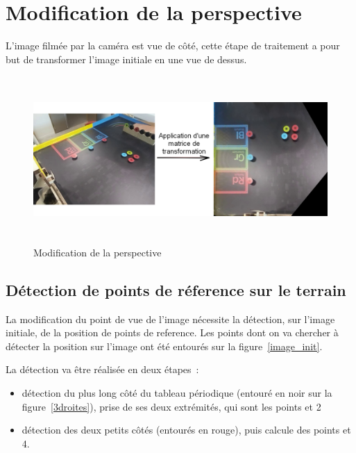 \documentclass{article}
\begin{document}

\section{Modification de la perspective}
L'image filmée par la caméra est vue de côté, cette étape de traitement a pour but de transformer l'image initiale en une vue de dessus.

\begin{figure}[!h]
\begin{center} 
\includegraphics[height=180pt]{application_matrice.png}  
\end{center}
\caption{Modification de la perspective}
\label{application_matrice}
\end{figure}

\subsection{Détection de points de réference sur le terrain}
La modification du point de vue de l'image nécessite la détection, sur l'image initiale, de la position de points de reference. Les points dont on va chercher à 
détecter la position sur l'image ont été entourés sur la figure~\ref{image_init}.

La détection va être réalisée en deux étapes :
\begin{itemize}
\item détection du plus long côté du tableau périodique (entouré en noir sur la figure~\ref{3droites}), prise de ses deux extrémités, qui sont les points  et 2
\item détection des deux petits côtés (entourés en rouge), puis calcule des points  et 4.
\end{itemize}
\end{document}
